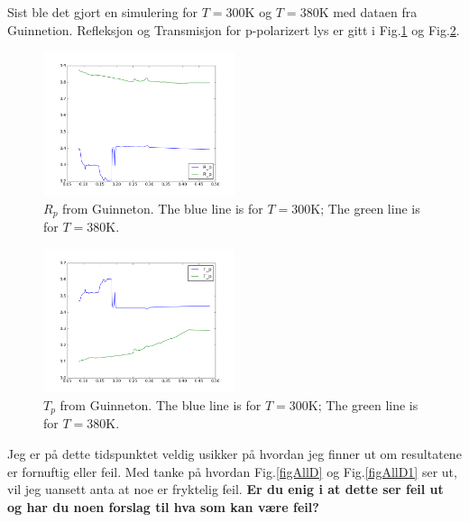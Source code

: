 Sist ble det gjort en simulering for $T = 300$K og $T = 380$K med dataen fra Guinnetion.
Refleksjon og Transmisjon for p-polarizert lys er gitt i Fig.\ref{fig1D} og Fig.\ref{fig2D}.
%
\begin{figure}[h!] 
\centering 
\includegraphics[width=0.5\textwidth]{Figures/vo2Rp_blue300K_green380K.png} 
\caption{ $R_p$ from Guinneton. The blue line is for $T = 300$K; The green line is for $T=380$K.}
\label{fig1D}
\end{figure}
%
%
\begin{figure}[h!] 
\centering 
\includegraphics[width=0.5\textwidth]{Figures/vo2Tp_blue300K_green380K.png} 
\caption{ $T_p$ from Guinneton. The blue line is for $T = 300$K; The green line is for $T=380$K.}
\label{fig2D}
\end{figure}
%
\newpage
Jeg er på dette tidspunktet veldig usikker på hvordan jeg finner ut om resultatene er fornuftig eller
feil. Med tanke på hvordan Fig.\ref{figAllD} og Fig.\ref{figAllD1} ser ut, vil jeg uansett anta at 
noe er fryktelig feil. 
\textbf{Er du enig i at dette ser feil ut og har du noen forslag til hva som kan være feil?}
